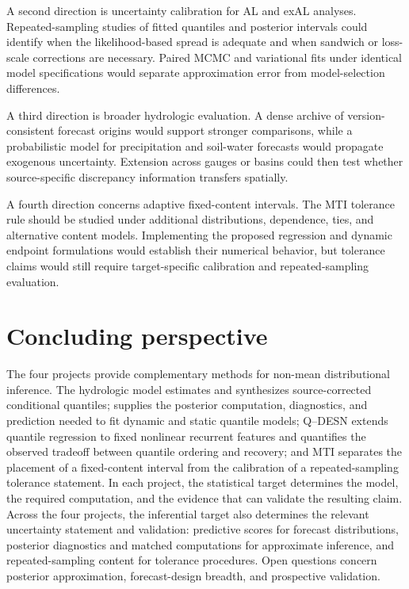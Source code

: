 A second direction is uncertainty calibration for AL and exAL analyses.
Repeated-sampling studies of fitted quantiles and posterior intervals could
identify when the likelihood-based spread is adequate and when sandwich or
loss-scale corrections are necessary. Paired MCMC and variational fits under
identical model specifications would separate approximation error from
model-selection differences.

A third direction is broader hydrologic evaluation. A dense archive of
version-consistent forecast origins would support stronger comparisons, while
a probabilistic model for precipitation and soil-water forecasts would
propagate exogenous uncertainty. Extension across gauges or basins could then
test whether source-specific discrepancy information transfers spatially.

A fourth direction concerns adaptive fixed-content intervals. The MTI tolerance
rule should be studied under additional distributions, dependence, ties, and
alternative content models. Implementing the proposed regression and dynamic
endpoint formulations would establish their numerical behavior, but tolerance
claims would still require target-specific calibration and repeated-sampling
evaluation.

\section{Concluding perspective}
\label{sec:synthesis-conclusion}

The four projects provide complementary methods for non-mean distributional
inference. The hydrologic model estimates and synthesizes source-corrected
conditional quantiles;  supplies the posterior computation,
diagnostics, and prediction needed to fit dynamic and static quantile models;
Q--DESN extends quantile regression to fixed nonlinear recurrent features and
quantifies the observed tradeoff between quantile ordering and recovery; and
MTI separates the placement of a fixed-content interval from the calibration
of a repeated-sampling tolerance statement. In each project, the statistical
target determines the model, the required computation, and the evidence that
can validate the resulting claim. Across the four projects, the inferential
target also determines the relevant uncertainty statement and validation:
predictive scores for forecast distributions, posterior diagnostics and
matched computations for approximate inference, and repeated-sampling content
for tolerance procedures. Open questions concern posterior approximation,
forecast-design breadth, and prospective validation.
